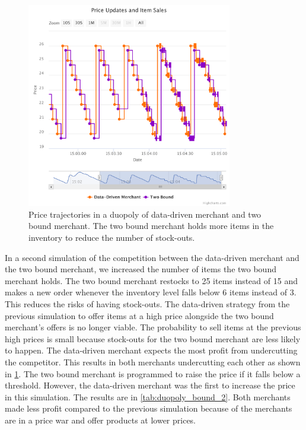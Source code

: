 \begin{figure}[t]
	\centering
	\includegraphics[width=0.8\textwidth]{figures/duopoly_bound_prices_2}
	\caption[Price trajectories: data-driven merchant versus two bound merchant with larger inventory]{Price trajectories in a duopoly of data-driven merchant and two bound merchant. The two bound merchant holds more items in the inventory to reduce the number of stock-outs.}
	\label{fig:duopoly_bound_prices_2}
\end{figure}

In a second simulation of the competition between the data-driven merchant and the two bound merchant, we increased the number of items the two bound merchant holds.
The two bound merchant restocks to 25 items instead of 15 and makes a new order whenever the inventory level falls below 6 items instead of 3.
This reduces the risks of having stock-outs.
The data-driven strategy from the previous simulation to offer items at a high price alongside the two bound merchant's offers is no longer viable.
The probability to sell items at the previous high prices is small because stock-outs for the two bound merchant are less likely to happen.
The data-driven merchant expects the most profit from undercutting the competitor.
This results in both merchants undercutting each other as shown in \cref{fig:duopoly_bound_prices_2}.
The two bound merchant is programmed to raise the price if it falls below a threshold.
However, the data-driven merchant was the first to increase the price in this simulation.
The results are in \cref{tab:duopoly_bound_2}.
Both merchants made less profit compared to the previous simulation because of the merchants are in a price war and offer products at lower prices.

